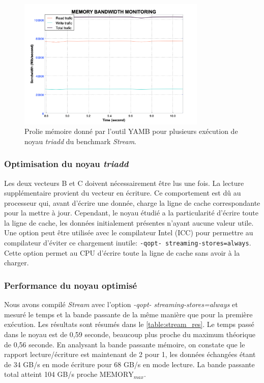         \begin{figure}[htb]
        {
        \centering
        \includegraphics[width=0.80\textwidth]{images/stream_before.png}
        \caption{Prolie mémoire donné par l'outil YAMB pour plusieurs exécution de noyau \textit{triadd} du benchmark \textit{Stream}. }\label{fig:stream_before}
        }
        \end{figure}


        
        \subsubsection{Optimisation du noyau \textit{triadd}}
            
            Les deux vecteurs B et C doivent nécessairement être lus une fois. La lecture supplémentaire provient du vecteur en écriture. Ce comportement est dû au processeur qui, avant d'écrire une donnée, charge la ligne de cache correspondante pour la mettre à jour. Cependant, le noyau étudié a la particularité d'écrire toute la ligne de cache, les données initialement présentes n'ayant aucune valeur utile. Une option peut être utilisée avec le compilateur Intel (ICC) pour permettre au compilateur d'éviter ce chargement inutile: \verb|-qopt- streaming-stores=always|. Cette option permet au CPU d'écrire toute la ligne de cache sans avoir à la charger.
            
        
        \subsubsection{Performance du noyau optimisé}
        
            Nous avons compilé \textit{Stream} avec l'option \textit{-qopt- streaming-stores=always} et mesuré le temps et la bande passante de la même manière que pour la première exécution. Les résultats sont résumés dans le \autoref{table:stream_res}. Le temps passé dans le noyau est de 0,59 seconde, beaucoup plus proche du maximum théorique de 0,56 seconde. En analysant la bande passante mémoire, on constate que le rapport lecture/écriture est maintenant de 2 pour 1, les données échangées étant de 34 GB/s en mode écriture pour 68 GB/s en mode lecture. La bande passante total atteint 104 GB/s proche $\text{MEMORY}_{max}$.
            
